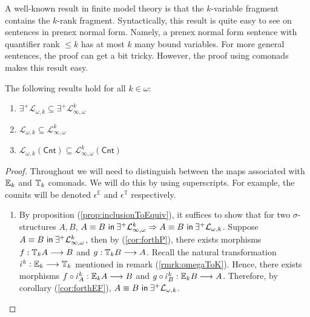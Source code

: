 A well-known result in finite model theory is that the $k$-variable fragment contains the $k$-rank fragment. Syntactically, this result is quite easy to see on sentences in prenex normal form. Namely, a prenex normal form sentence with quantifier rank $\leq k$ has at most $k$ many bound variables. For more general sentences, the proof can get a bit tricky. However, the proof using comonads makes this result easy. 
\begin{prop} The following results hold for all $k \in \omega$:
\begin{enumerate}[label=(\arabic*)]
\item $\exists^{+}\mathcal{L}_{\omega,k} \subseteq \exists^{+}\mathcal{L}^{k}_{\infty,\omega}$
\item $\mathcal{L}_{\omega,k} \subseteq \mathcal{L}^{k}_{\infty,\omega}$
\item $\mathcal{L}_{\omega,k}(\mathsf{Cnt}) \subseteq \mathcal{L}^{k}_{\infty,\omega}(\mathsf{Cnt})$
\end{enumerate}
\begin{proof}
Throughout we will need to distinguish between the maps associated with ${\mathbb{E}_{k}}$ and ${\mathbb{T}_{k}}$ comonads. We will do this by using superscripts. For example, the counits will be denoted $\epsilon^{\mathbb{E}}$ and $\epsilon^{\mathbb{T}}$ respectively.  
\begin{enumerate}[label=(\arabic*)]
\item By proposition (\ref{prop:inclusionToEquiv}), it suffices to show that for two $\sigma$-structures $A,B$, ${A \equiv B \ \mathsf{in}\: \exists^{+}\mathcal{L}^{k}_{\infty,\omega}} \Rightarrow {A \equiv B \ \mathsf{in}\: \exists^{+}\mathcal{L}_{\omega,k}}$. Suppose ${A \equiv B \ \mathsf{in}\: \exists^{+}\mathcal{L}^{k}_{\infty,\omega}} $, then by (\ref{cor:forthP}), there exists morphisms $f:{\mathbb{T}_{k}A} \longrightarrow B$ and $g:{\mathbb{T}_{k}B} \longrightarrow A$. Recall the natural transformation $\iota^{k}:\efcomonad{k}{} \longrightarrow \pcomonad{k}{}$ mentioned in remark (\ref{rmrk:omegaToK}). Hence, there exists morphisms $f \circ \iota^{k}_{A}:\efcomonad{k}{A} \longrightarrow B$ and $g \circ \iota^{k}_{B}:\efcomonad{k}{B} \longrightarrow A$. Therefore, by corollary (\ref{cor:forthEF}), ${A \equiv B \ \mathsf{in}\: \exists^{+}\mathcal{L}_{\omega,k}}$.

\end{enumerate}
\end{proof}
\end{prop}
